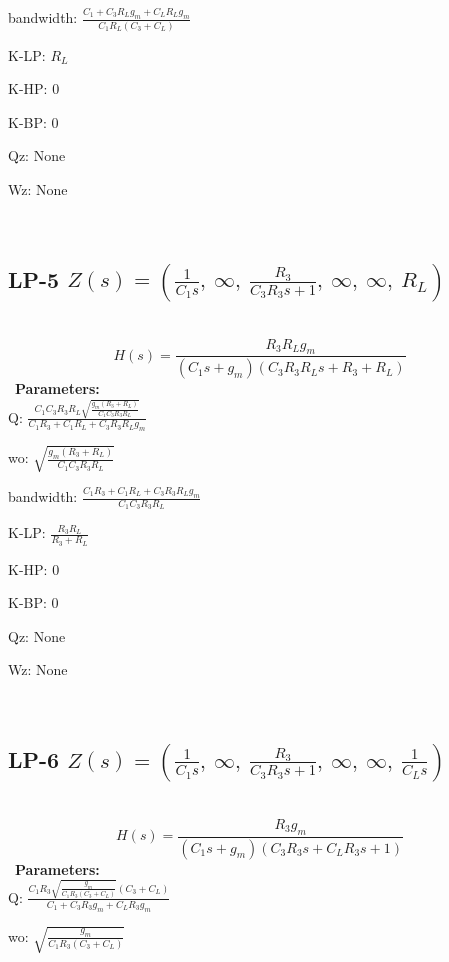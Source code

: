\documentclass{article}
\begin{document}
bandwidth: $\frac{C_{1} + C_{3} R_{L} g_{m} + C_{L} R_{L} g_{m}}{C_{1} R_{L} \left(C_{3} + C_{L}\right)}$\ 

K-LP: $R_{L}$\ 

K-HP: $0$\ 

K-BP: $0$\ 

Qz: $\text{None}$\ 

Wz: $\text{None}$\ 

\ 

\subsection{LP-5 $Z(s) = \left( \frac{1}{C_{1} s}, \  \infty, \  \frac{R_{3}}{C_{3} R_{3} s + 1}, \  \infty, \  \infty, \  R_{L}\right)$ } \ 
\textbf{\[H(s) = \frac{R_{3} R_{L} g_{m}}{\left(C_{1} s + g_{m}\right) \left(C_{3} R_{3} R_{L} s + R_{3} + R_{L}\right)}\] } \ 
\textbf{Parameters:}\\ 

Q: $\frac{C_{1} C_{3} R_{3} R_{L} \sqrt{\frac{g_{m} \left(R_{3} + R_{L}\right)}{C_{1} C_{3} R_{3} R_{L}}}}{C_{1} R_{3} + C_{1} R_{L} + C_{3} R_{3} R_{L} g_{m}}$\ 

wo: $\sqrt{\frac{g_{m} \left(R_{3} + R_{L}\right)}{C_{1} C_{3} R_{3} R_{L}}}$\ 

bandwidth: $\frac{C_{1} R_{3} + C_{1} R_{L} + C_{3} R_{3} R_{L} g_{m}}{C_{1} C_{3} R_{3} R_{L}}$\ 

K-LP: $\frac{R_{3} R_{L}}{R_{3} + R_{L}}$\ 

K-HP: $0$\ 

K-BP: $0$\ 

Qz: $\text{None}$\ 

Wz: $\text{None}$\ 

\ 

\subsection{LP-6 $Z(s) = \left( \frac{1}{C_{1} s}, \  \infty, \  \frac{R_{3}}{C_{3} R_{3} s + 1}, \  \infty, \  \infty, \  \frac{1}{C_{L} s}\right)$ } \ 
\textbf{\[H(s) = \frac{R_{3} g_{m}}{\left(C_{1} s + g_{m}\right) \left(C_{3} R_{3} s + C_{L} R_{3} s + 1\right)}\] } \ 
\textbf{Parameters:}\\ 

Q: $\frac{C_{1} R_{3} \sqrt{\frac{g_{m}}{C_{1} R_{3} \left(C_{3} + C_{L}\right)}} \left(C_{3} + C_{L}\right)}{C_{1} + C_{3} R_{3} g_{m} + C_{L} R_{3} g_{m}}$\ 

wo: $\sqrt{\frac{g_{m}}{C_{1} R_{3} \left(C_{3} + C_{L}\right)}}$\ 
\end{document}
